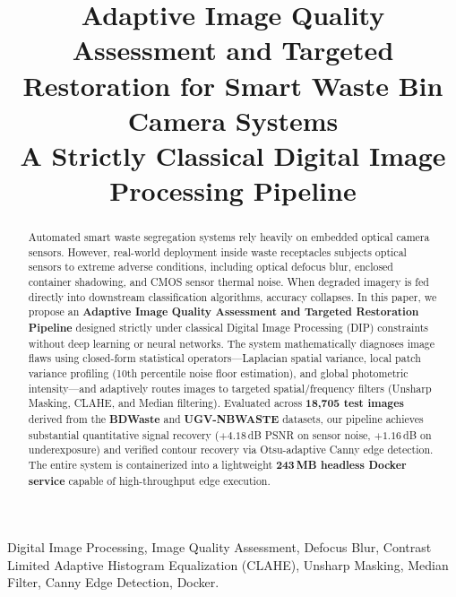 \documentclass[conference]{IEEEtran}
\begin{document}
\title{Adaptive Image Quality Assessment and Targeted Restoration for Smart Waste Bin Camera Systems\\
\large A Strictly Classical Digital Image Processing Pipeline}

\author{
}

\maketitle

\begin{abstract}
Automated smart waste segregation systems rely heavily on embedded optical camera sensors. However, real-world deployment inside waste receptacles subjects optical sensors to extreme adverse conditions, including optical defocus blur, enclosed container shadowing, and CMOS sensor thermal noise. When degraded imagery is fed directly into downstream classification algorithms, accuracy collapses. In this paper, we propose an \textbf{Adaptive Image Quality Assessment and Targeted Restoration Pipeline} designed strictly under classical Digital Image Processing (DIP) constraints without deep learning or neural networks. The system mathematically diagnoses image flaws using closed-form statistical operators—Laplacian spatial variance, local patch variance profiling (10th percentile noise floor estimation), and global photometric intensity—and adaptively routes images to targeted spatial/frequency filters (Unsharp Masking, CLAHE, and Median filtering). Evaluated across \textbf{18,705 test images} derived from the \textbf{BDWaste} and \textbf{UGV-NBWASTE} datasets, our pipeline achieves substantial quantitative signal recovery ($+4.18$\,dB PSNR on sensor noise, $+1.16$\,dB on underexposure) and verified contour recovery via Otsu-adaptive Canny edge detection. The entire system is containerized into a lightweight \textbf{243\,MB headless Docker service} capable of high-throughput edge execution.
\end{abstract}

\begin{IEEEkeywords}
Digital Image Processing, Image Quality Assessment, Defocus Blur, Contrast Limited Adaptive Histogram Equalization (CLAHE), Unsharp Masking, Median Filter, Canny Edge Detection, Docker.
\end{IEEEkeywords}
\end{document}
